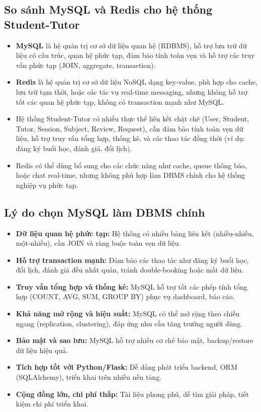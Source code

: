 \subsection{So sánh MySQL và Redis cho hệ thống Student-Tutor}
\begin{itemize}
    \item \textbf{MySQL} là hệ quản trị cơ sở dữ liệu quan hệ (RDBMS), hỗ trợ lưu trữ dữ liệu có cấu trúc, quan hệ phức tạp, đảm bảo tính toàn vẹn và hỗ trợ các truy vấn phức tạp (JOIN, aggregate, transaction).
    \item \textbf{Redis} là hệ quản trị cơ sở dữ liệu NoSQL dạng key-value, phù hợp cho cache, lưu trữ tạm thời, hoặc các tác vụ real-time messaging, nhưng không hỗ trợ tốt các quan hệ phức tạp, không có transaction mạnh như MySQL.
    \item Hệ thống Student-Tutor có nhiều thực thể liên kết chặt chẽ (User, Student, Tutor, Session, Subject, Review, Request), cần đảm bảo tính toàn vẹn dữ liệu, hỗ trợ truy vấn tổng hợp, thống kê, và các thao tác đồng thời (ví dụ: đăng ký buổi học, đánh giá, đổi lịch).
    \item Redis có thể dùng bổ sung cho các chức năng như cache, queue thông báo, hoặc chat real-time, nhưng không phù hợp làm DBMS chính cho hệ thống nghiệp vụ phức tạp.
\end{itemize}

\subsection{Lý do chọn MySQL làm DBMS chính}
\begin{itemize}
    \item \textbf{Dữ liệu quan hệ phức tạp:} Hệ thống có nhiều bảng liên kết (nhiều-nhiều, một-nhiều), cần JOIN và ràng buộc toàn vẹn dữ liệu.
    \item \textbf{Hỗ trợ transaction mạnh:} Đảm bảo các thao tác như đăng ký buổi học, đổi lịch, đánh giá đều nhất quán, tránh double-booking hoặc mất dữ liệu.
    \item \textbf{Truy vấn tổng hợp và thống kê:} MySQL hỗ trợ tốt các phép tính tổng hợp (COUNT, AVG, SUM, GROUP BY) phục vụ dashboard, báo cáo.
    \item \textbf{Khả năng mở rộng và hiệu suất:} MySQL có thể mở rộng theo chiều ngang (replication, clustering), đáp ứng nhu cầu tăng trưởng người dùng.
    \item \textbf{Bảo mật và sao lưu:} MySQL hỗ trợ nhiều cơ chế bảo mật, backup/restore dữ liệu hiệu quả.
    \item \textbf{Tích hợp tốt với Python/Flask:} Dễ dàng phát triển backend, ORM (SQLAlchemy), triển khai trên nhiều nền tảng.
    \item \textbf{Cộng đồng lớn, chi phí thấp:} Tài liệu phong phú, dễ tìm giải pháp, tiết kiệm chi phí triển khai.
\end{itemize}

